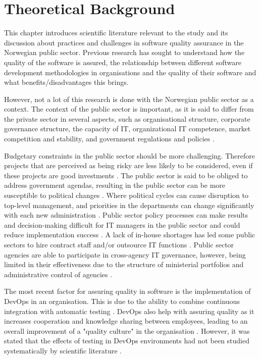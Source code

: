 \chapter{Theoretical Background} \label{sec:theoretical_background}
This chapter introduces scientific literature relevant to the study and its discussion about practices and challenges in software quality assurance in the Norwegian public sector. Previous research has sought to understand how the quality of the software is assured, the relationship between different software development methodologies in organisations and the quality of their software and what benefits/disadvantages this brings. 

However, not a lot of this research is done with the Norwegian public sector as a context. The context of the public sector is important, as it is said to differ from the private sector in several aspects, such as organisational structure, corporate governance structure, the capacity of IT, organizational IT competence, market competition and stability, and government regulations and policies \cite{jc_2010}.

Budgetary constraints in the public sector should be more challenging. Therefore projects that are perceived as being risky are less likely to be considered, even if these projects are good investments \cite{jc_2010}. The public sector is said to be obliged to address government agendas, resulting in the public sector can be more susceptible to political changes \cite{jc_2010}. Where political cycles can cause disruption to top-level management, and priorities in the departments can change significantly with each new administration \cite{jc_2010}. Public sector policy processes can make results and decision-making difficult for IT managers in the public sector and could reduce implementation success \cite{jc_2010}. A lack of in-house shortages has led some public sectors to hire contract staff and/or outsource IT functions \cite{jc_2010}. Public sector agencies are able to participate in cross-agency IT governance, however, being limited in their effectiveness due to the structure of ministerial portfolios and administrative control of agencies \cite{jc_2010}.

The most recent factor for assuring quality in software is the implementation of DevOps in an organisation. This is due to the ability to combine continuous integration with automatic testing \cite{am_2020}\cite{smm_2018}\cite{ml_2022}. DevOps also help with assuring quality as it increases cooperation and knowledge sharing between employees, leading to an overall improvement of a "quality culture" in the organisation \cite{smm_2018}\cite{mm_2021}. However, it was stated that the effects of testing in DevOps environments had not been studied systematically by scientific literature \cite{dsc_2019}\cite{ja_2016}.

